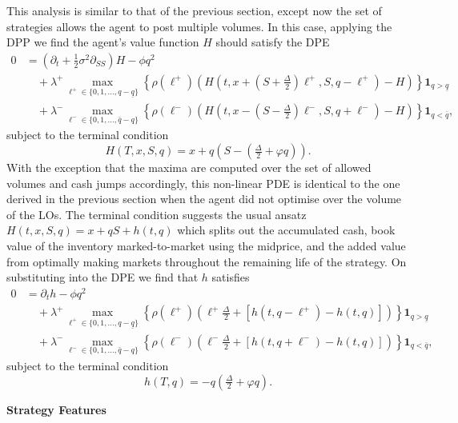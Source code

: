 \documentclass[11pt, a4paper]{book}
\newcommand{\Ind}{\mathbf{1}}
\begin{document}
	This analysis is similar to that of the previous section, except now the set of strategies allows the agent to post multiple volumes. In this case, applying the DPP we find the agent's value function $H$ should satisfy the DPE
	\begin{align*}
		0 &= \left( \partial_t + \tfrac{1}{2}\sigma^2 \partial_{SS} \right) H - \phi q^2 \\
		&\quad + \lambda^+ \max_{\ell^+ \in \{0, 1, \dots, q-\underline{q}\}} \left\{ \rho(\ell^+) \left( H\left(t, x + (S + \tfrac{\Delta}{2})\ell^+, S, q - \ell^+\right) - H \right) \right\} \Ind_{q > \underline{q}} \\
		&\quad + \lambda^- \max_{\ell^- \in \{0, 1, \dots, \bar{q}-q\}} \left\{ \rho(\ell^-) \left( H\left(t, x - (S - \tfrac{\Delta}{2})\ell^-, S, q + \ell^-\right) - H \right) \right\} \Ind_{q < \bar{q}},
	\end{align*}
	subject to the terminal condition
	\[
	H(T, x, S, q) = x + q (S - (\tfrac{\Delta}{2} + \varphi q)).
	\]
	With the exception that the maxima are computed over the set of allowed volumes and cash jumps accordingly, this non-linear PDE is identical to the one derived in the previous section when the agent did not optimise over the volume of the LOs. The terminal condition suggests the usual ansatz $H(t, x, S, q) = x + q S + h(t, q)$ which splits out the accumulated cash, book value of the inventory marked-to-market using the midprice, and the added value from optimally making markets throughout the remaining life of the strategy. On substituting into the DPE we find that $h$ satisfies
	\begin{align*}
		0 &= \partial_t h - \phi q^2 \\
		&\quad + \lambda^+ \max_{\ell^+ \in \{0, 1, \dots, q-\underline{q}\}} \left\{ \rho(\ell^+) \left( \ell^+ \tfrac{\Delta}{2} + [h(t, q - \ell^+) - h(t, q)] \right) \right\} \Ind_{q > \underline{q}} \\
		&\quad + \lambda^- \max_{\ell^- \in \{0, 1, \dots, \bar{q}-q\}} \left\{ \rho(\ell^-) \left( \ell^- \tfrac{\Delta}{2} + [h(t, q + \ell^-) - h(t, q)] \right) \right\} \Ind_{q < \bar{q}},
	\end{align*}
	subject to the terminal condition
	\[
	h(T, q) = -q \left(\tfrac{\Delta}{2} + \varphi q\right).
	\]
	
	\textbf{Strategy Features}
	
\end{document}
